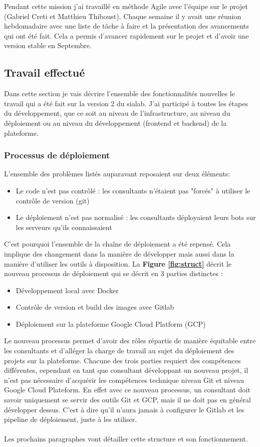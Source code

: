 \documentclass{article} %
\begin{document}
Pendant cette mission j'ai travaillé en méthode Agile avec l'équipe sur le projet (Gabriel Creti et Matthieu Thiboust). Chaque semaine il y avait une réunion hebdomadaire avec une liste de tâche à faire et la présentation des avancements qui ont été fait. Cela a permis d'avancer rapidement sur le projet et d'avoir une version stable en Septembre.

\subsection{Travail effectué}
Dans cette section je vais décrire l'ensemble des fonctionnalités nouvelles le travail qui a été fait sur la version 2 du sialab. J'ai participé à toutes les étapes du développement, que ce soit au niveau de l'infrastructure, au niveau du déploiement ou au niveau du développement (frontend et backend) de la plateforme.

\subsubsection{Processus de déploiement}

L'ensemble des problèmes listés auparavant reposaient sur deux éléments:
\begin{itemize}
	\item Le code n'est pas contrôlé : les consultants n'étaient pas "forcés" à utiliser le contrôle de version (git)
	\item Le déploiement n'est pas normalisé : les consultants déployaient leurs bots sur les serveurs qu'ils connaissaient
\end{itemize}
C'est pourquoi l'ensemble de la chaîne de déploiement a été repensé. Cela implique des changement dans la manière de développer mais aussi dans la manière d'utiliser les outils à disposition. La \textbf{Figure \ref{fig:struct}} décrit le nouveau processus de déploiement qui se décrit en 3 parties distinctes :
\begin{itemize}
	\item Développement local avec Docker
	\item Contrôle de version et build des images avec Gitlab
	\item Déploiement sur la plateforme Google Cloud Platform (GCP)
\end{itemize}
Le nouveau processus permet d'avoir des rôles répartis de manière équitable entre les consultants et d'alléger la charge de travail au sujet du déploiement des projets sur la plateforme. Chacune des trois parties requiert des compétences différentes, cependant en tant que consultant développant un nouveau projet, il n'est pas nécessaire d'acquérir les compétences technique niveau Git et niveau Google Cloud Plateform. En effet avec ce nouveau processus, un consultant doit savoir uniquement se servir des outils Git et GCP, mais il ne doit pas en général développer dessus. C'est à dire qu'il n'aura jamais à configurer le Gitlab et les pipeline de déploiement, juste à les utiliser.\\ \\
Les prochains paragraphes vont détailler cette structure et son fonctionnement.
\newpage
\end{document}
